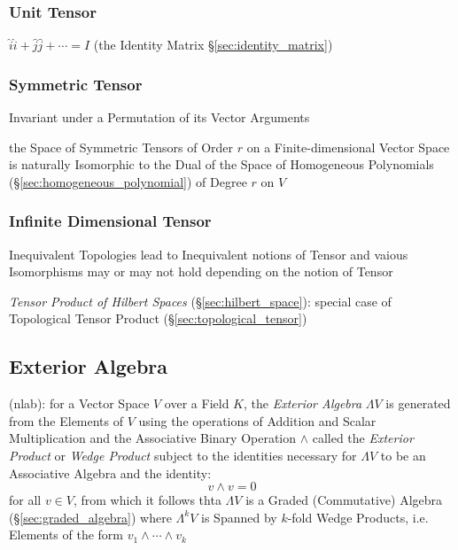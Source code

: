 \subsubsection{Unit Tensor}\label{sec:unit_tensor}

$\hat{i}\hat{i} + \hat{j}\hat{j} + \cdots = I$ (the Identity Matrix
\S\ref{sec:identity_matrix})



\subsubsection{Symmetric Tensor}\label{sec:symmetric_tensor}

Invariant under a Permutation of its Vector Arguments

the Space of Symmetric Tensors of Order $r$ on a Finite-dimensional Vector
Space is naturally Isomorphic to the Dual of the Space of Homogeneous
Polynomials (\S\ref{sec:homogeneous_polynomial}) of Degree $r$ on $V$



\subsubsection{Infinite Dimensional Tensor}
\label{sec:infinite_dimensional_tensor}

Inequivalent Topologies lead to Inequivalent notions of Tensor and
vaious Isomorphisms may or may not hold depending on the notion of
Tensor

\emph{Tensor Product of Hilbert Spaces} (\S\ref{sec:hilbert_space}):
special case of Topological Tensor Product
(\S\ref{sec:topological_tensor})



\subsection{Exterior Algebra}\label{sec:exterior_algebra}

(nlab): for a Vector Space $V$ over a Field $K$, the \emph{Exterior Algebra}
$\Lambda{V}$ is generated from the Elements of $V$ using the operations of
Addition and Scalar Multiplication and the Associative Binary Operation $\wedge$
called the \emph{Exterior Product} or \emph{Wedge Product} subject to the
identities necessary for $\Lambda{V}$ to be an Associative Algebra and the
identity:
\[
  v \wedge v = 0
\]
for all $v \in V$, from which it follows thta $\Lambda{V}$ is a Graded
(Commutative) Algebra (\S\ref{sec:graded_algebra}) where $\Lambda^k{V}$ is
Spanned by $k$-fold Wedge Products, i.e. Elements of the form $v_1 \wedge \cdots
\wedge v_k$

